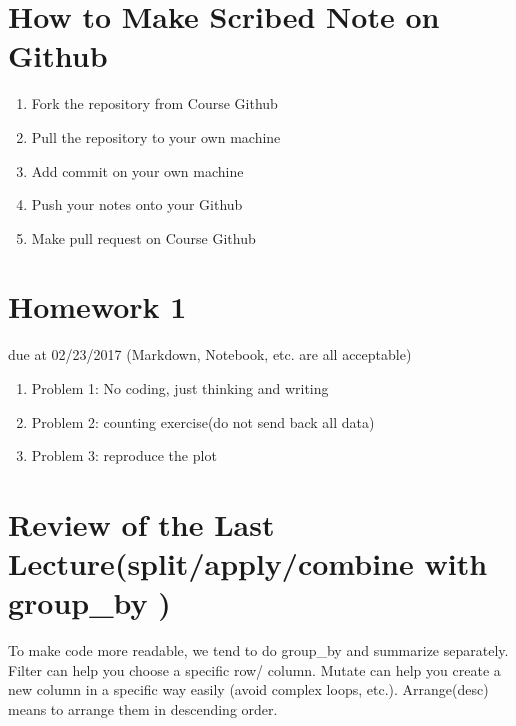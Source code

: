 \section{How to Make Scribed Note on Github}
\begin{enumerate}
  \item Fork the repository from Course Github
  \item Pull the repository to your own machine 
  \item Add commit on your own machine
  \item Push your notes onto your Github
  \item Make pull request on Course Github
\end{enumerate}

\section{Homework 1}
due at 02/23/2017 (Markdown, Notebook, etc. are all acceptable)
\begin{enumerate}
  \item Problem 1: No coding, just thinking and writing
  \item Problem 2: counting exercise(do not send back all data)
  \item Problem 3: reproduce the plot
\end{enumerate}

\section{Review of the Last Lecture(split/apply/combine with group\_by
)}
To make code more readable, we tend to do group\_by and summarize separately. Filter can help you choose a specific row/ column. Mutate can help you create a new column in a specific way easily (avoid complex loops, etc.). Arrange(desc) means to arrange them in descending order.

